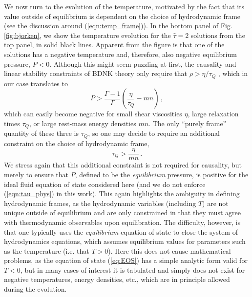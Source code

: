 \documentclass[%
notitlepage,
superscriptaddress,
nofootinbib,
amsmath,
amssymb,
aps,
twocolumn
]{revtex4-1}
\begin{document}
We now turn to the evolution of the temperature,
motivated by the fact that its value outside of equilibrium is dependent
on the choice of hydrodynamic frame (see the discussion around 
(\ref{eqn:temp_frame})).
In the bottom panel of Fig. \ref{fig:bjorken}, we show the temperature
evolution for the $\hat{\tau} = 2$ solutions from the top panel, in solid
black lines.  Apparent from the figure is that one of the solutions has a
negative temperature and, therefore, also negative equilibrium 
pressure, $P<0$. Although this might seem puzzling at first, 
the causality and linear stability constraints of
BDNK theory only require that $\rho > \eta/\tau_Q$ \cite{Bemfica:2020zjp},
which in our case translates to
\begin{equation}\label{eq:Pmin}
P > \frac{\Gamma-1}{\Gamma} \left(\frac{\eta}{\tau_Q} - m n\right)\,,
 \end{equation}
which can easily become negative for small shear viscosities $\eta$, large relaxation times $\tau_{Q}$, or large rest-mass energy densities $m n$.  The only ``purely frame'' quantity of these three is $\tau_{Q}$, so one may decide to require an additional constraint on the choice of hydrodynamic frame,
\begin{equation}\label{eqn:tau_phys}
\tau_Q > \frac{\eta}{m n} \,.
\end{equation}
We stress again that this additional constraint is not required for
causality, but merely to ensure that $P$, defined to be the \textit{equilibrium} pressure, is positive for
the ideal fluid equation of state considered here 
(and we do not enforce (\ref{eqn:tau_phys}) in this work).
This again highlights the
ambiguity in defining hydrodynamic frames, as the hydrodynamic variables (including
$T$) are not unique outside of equilibrium and are only constrained in that
they must agree with thermodynamic observables upon equilibration.  The
difficulty, however, is that one typically uses the \textit{equilibrium}
equation of state to close the system of hydrodynamics equations, which
assumes equilibrium values for parameters such as the temperature (i.e.
that $T > 0$).  Here this does not cause mathematical problems, as the
equation of state (\ref{eq:EOS}) has a simple analytic form valid for $T <
0$, but in many cases of interest it is tabulated and simply does not exist
for negative temperatures, energy densities, etc., which are in principle
allowed during the evolution.
\end{document}

